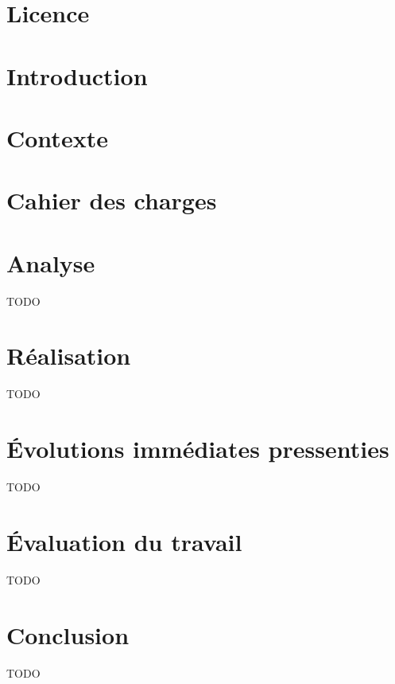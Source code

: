 \documentclass[12pt]{report}
\begin{document}

	\setcounter{page}{1}

	\chapter*{Licence}
	\clearpage

	\renewcommand{\thepage}{\roman{page}}

	\tableofcontents
	\clearpage

	\renewcommand{\thepage}{\arabic{page}}

	\chapter{Introduction}
	\label{ch:introduction}

		

	\chapter{Contexte}
	\label{ch:context}

	    

	\chapter{Cahier des charges}
	\label{ch:specifications}

		

	\chapter{Analyse}
	\label{ch:analysis}

		TODO

	\chapter{Réalisation}
	\label{ch:implementation}

		TODO

	\chapter{Évolutions immédiates pressenties}
	\label{ch:next-steps}

		TODO

	\chapter{Évaluation du travail}
	\label{ch:auto-critic}

		TODO

	\chapter{Conclusion}
	\label{ch:conclusion}

		TODO

	\printbibliography

\end{document}
